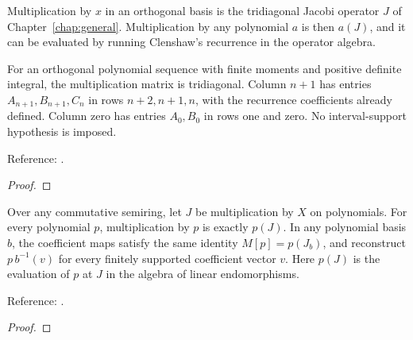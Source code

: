 \begin{supporting}
Multiplication by $x$ in an orthogonal basis is the tridiagonal Jacobi operator
$J$ of Chapter~\ref{chap:general}. Multiplication by any polynomial $a$ is then
$a(J)$, and it can be evaluated by running Clenshaw's recurrence in the operator
algebra.

\begin{theorem}
\label{thm:general-multiplication-matrix}
\leanok
For an orthogonal polynomial sequence with finite moments and positive definite
integral, the multiplication matrix is tridiagonal. Column $n+1$ has entries
$A_{n+1},B_{n+1},C_n$ in rows $n+2,n+1,n$, with the recurrence coefficients
already defined. Column zero has entries $A_0,B_0$ in rows one and zero.
No interval-support hypothesis is imposed.

Reference: \cite[18.2(iv)]{dlmf}.
\end{theorem}
\begin{proof}
\leanok
\end{proof}
\end{supporting}


\begin{theorem}
\label{thm:polynomial-functional-calculus}
\leanok
Over any commutative semiring, let $J$ be multiplication by $X$ on polynomials.
For every polynomial $p$, multiplication by $p$ is exactly $p(J)$.
In any polynomial basis $b$, the coefficient maps satisfy the same identity
$M[p]=p(J_b)$, and reconstruct $p\,b^{-1}(v)$ for every finitely supported
coefficient vector $v$. Here $p(J)$ is the evaluation of $p$ at $J$ in the
algebra of linear endomorphisms.


Reference: \cite[Sections 2--3]{olver-townsend}.
\end{theorem}
\begin{proof}
\leanok
\end{proof}



